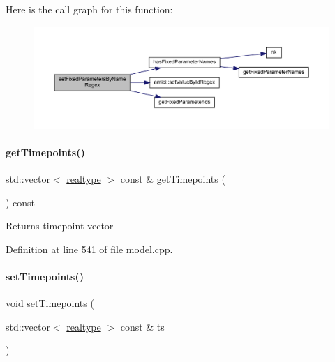 Here is the call graph for this function\+:
\nopagebreak
\begin{figure}[H]
\begin{center}
\leavevmode
\includegraphics[width=350pt]{classamici_1_1_model_a4802f7d56264e3b592c167da8166cb73_cgraph}
\end{center}
\end{figure}
\mbox{\label{classamici_1_1_model_a50ea5198d117f8f4ad1e34bb279975c8}} 
\paragraph{\texorpdfstring{get\+Timepoints()}{getTimepoints()}}
{\footnotesize\ttfamily std\+::vector$<$ \mbox{\hyperlink{namespaceamici_a1bdce28051d6a53868f7ccbf5f2c14a3}{realtype}} $>$ const  \& get\+Timepoints (\begin{DoxyParamCaption}{ }\end{DoxyParamCaption}) const}

\begin{DoxyReturn}{Returns}
timepoint vector 
\end{DoxyReturn}


Definition at line 541 of file model.\+cpp.

\mbox{\label{classamici_1_1_model_a50f9642f9bcb883dbd3925c85abc4c24}} 
\paragraph{\texorpdfstring{set\+Timepoints()}{setTimepoints()}}
{\footnotesize\ttfamily void set\+Timepoints (\begin{DoxyParamCaption}\item[{std\+::vector$<$ \mbox{\hyperlink{namespaceamici_a1bdce28051d6a53868f7ccbf5f2c14a3}{realtype}} $>$ const \&}]{ts }\end{DoxyParamCaption})}


